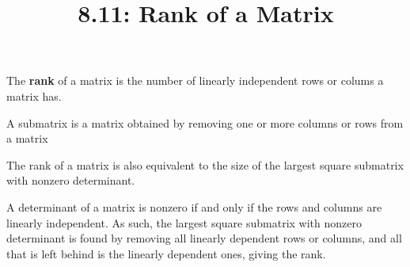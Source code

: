 \documentclass{article}
\title{8.11: Rank of a Matrix}
\begin{document}
\maketitle
\begin{definition}[Rank]
The \textbf{rank} of a matrix is the number of linearly independent rows or colums a matrix has.
\end{definition}

\begin{definition}[Submatrices]
A submatrix is a matrix obtained by removing one or more columns or rows from a matrix
\end{definition}

\begin{proposition}
The rank of a matrix is also equivalent to the size of the largest square submatrix with nonzero determinant.
\end{proposition}

\begin{customproof}
A determinant of a matrix is nonzero if and only if the rows and columns are linearly independent. As such, the largest square submatrix with nonzero determinant is found by removing all linearly dependent rows or columns, and all that is left behind is the linearly dependent ones, giving the rank.
\end{customproof}
\end{document}
